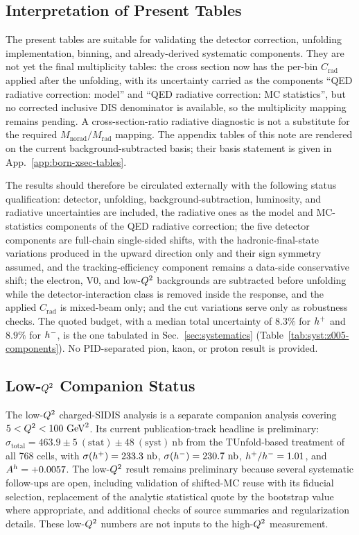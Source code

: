 \subsection{Interpretation of Present Tables}
\label{sec:results:present-tables}

The present tables are suitable for validating the detector correction,
unfolding implementation, binning, and already-derived systematic components.
They are not yet the final multiplicity tables: the cross section now has the
per-bin $C_{\mathrm{rad}}$ applied after the unfolding, with its uncertainty carried
as the components ``QED radiative correction: model'' and ``QED radiative correction: MC statistics'',
but no corrected inclusive DIS denominator is
available, so the multiplicity mapping remains pending. A
cross-section-ratio radiative diagnostic is not a substitute for the required
$M_{\mathrm{norad}}/M_{\mathrm{rad}}$ mapping.  The appendix tables of this
note are rendered on the current background-subtracted basis; their basis
statement is given in App.~\ref{app:born-xsec-tables}.

The results should therefore be circulated externally with the following status
qualification: detector, unfolding, background-subtraction, luminosity, and
radiative uncertainties are included, the radiative ones as the
model and MC-statistics components of the QED radiative correction; the five detector components
are full-chain single-sided shifts, with the hadronic-final-state variations produced in the upward
direction only and their sign symmetry assumed, and the tracking-efficiency
component remains a data-side conservative shift; the electron, V0, and
low-$Q^{2}$ backgrounds are subtracted before unfolding while the
detector-interaction class is removed inside the response, and the applied
$C_{\mathrm{rad}}$ is mixed-beam only; and the cut
variations serve only as robustness checks.  The quoted budget, with a median total uncertainty of $8.3\%$ for $h^{+}$ and
$8.9\%$ for $h^{-}$, is the one tabulated in Sec.~\ref{sec:systematics}
(Table~\ref{tab:syst:z005-components}).  No PID-separated
pion, kaon, or proton result is provided.

\subsection{Low-$Q^{2}$ Companion Status}
\label{sec:results:lowq2-companion}

The low-$Q^{2}$ charged-SIDIS analysis is a separate companion analysis covering
$5<Q^{2}<100~\text{GeV}^{2}$.  Its current publication-track headline is preliminary:
$\sigma_{\mathrm{total}}=463.9\pm5~\mathrm{(stat)}\pm48~\mathrm{(syst)}~\mathrm{nb}$
from the TUnfold-based treatment of all 768 cells, with $\sigma(h^{+})=233.3~\mathrm{nb}$,
$\sigma(h^{-})=230.7~\mathrm{nb}$, $h^{+}/h^{-}=1.01$, and
$A^{h}=+0.0057$.  The low-$Q^{2}$ result remains preliminary because several
systematic follow-ups are open, including validation of shifted-MC reuse with
its fiducial selection, replacement of the analytic statistical quote by the bootstrap
value where appropriate, and additional checks of source summaries and
regularization details.  These low-$Q^{2}$ numbers are not inputs to the
high-$Q^{2}$ measurement.

